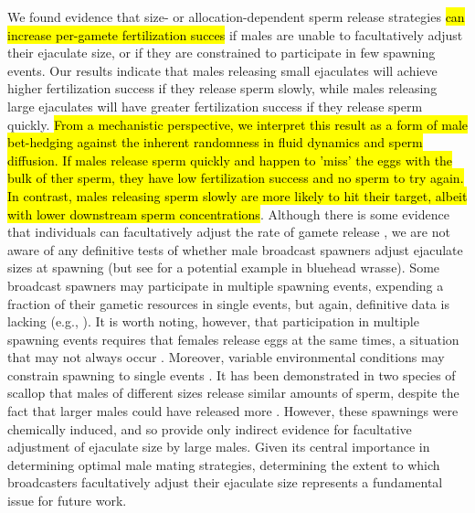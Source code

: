 \documentclass{article}
\begin{document}
We found evidence that size- or allocation-dependent sperm release strategies \hl{can increase per-gamete fertilization succes} if males are unable to facultatively adjust their ejaculate size, or if they are constrained to participate in few spawning events. Our results indicate that males releasing small ejaculates will achieve higher fertilization success if they release sperm slowly, while males releasing large ejaculates will have greater fertilization success if they release sperm quickly. \hl{From a mechanistic perspective, we interpret this result as a form of male bet-hedging against the inherent randomness in fluid dynamics and sperm diffusion. If males release sperm quickly and happen to 'miss' the eggs with the bulk of ther sperm, they have low fertilization success and no sperm to try again. In contrast, males releasing sperm slowly are more likely to hit their target, albeit with lower downstream sperm concentrations}. Although there is some evidence that individuals can facultatively adjust the rate of gamete release \citep{Marshall2004}, we are not aware of any definitive tests of whether male broadcast spawners adjust ejaculate sizes at spawning (but see \citealt{PetersenEtAl2001} for a potential example in bluehead wrasse). Some broadcast spawners may participate in multiple spawning events, expending a fraction of their gametic resources in single events, but again, definitive data is lacking (e.g., \citealt{Levitan1988,McEuan1988,LotterhosLevitan2011}). It is worth noting, however, that participation in multiple spawning events requires that females release eggs at the same times, a situation that may not always occur \citep{Olito2015,Olito2017}. Moreover, variable environmental conditions may constrain spawning to single events \citep{Olito2015,Olito2017}. It has been demonstrated in two species of scallop that males of different sizes release similar amounts of sperm, despite the fact that larger males could have released more \citep{Styan2003}. However, these spawnings were chemically induced, and so provide only indirect evidence for facultative adjustment of ejaculate size by large males. Given its central importance in determining optimal male mating strategies, determining the extent to which broadcasters facultatively adjust their ejaculate size represents a fundamental issue for future work.
\end{document}
